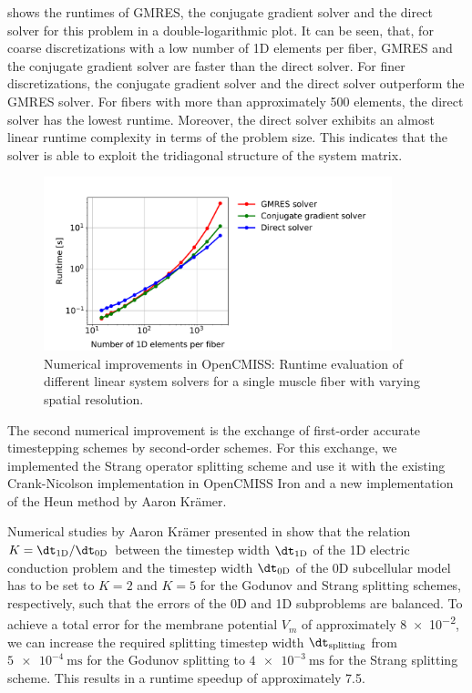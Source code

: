  shows the runtimes of GMRES, the conjugate gradient solver and the direct solver for this problem in a double-logarithmic plot.
It can be seen, that, for coarse discretizations with a low number of 1D elements per fiber, GMRES and the conjugate gradient solver are faster than the direct solver. For finer discretizations, the conjugate gradient solver and the direct solver outperform the GMRES solver. For fibers with more than approximately 500 elements, the direct solver has the lowest runtime. Moreover, the direct solver exhibits an almost linear runtime complexity in terms of the problem size. This indicates that the solver is able to exploit the tridiagonal structure of the system matrix.

\begin{figure}
  \centering%
  \includegraphics[width=0.9\textwidth]{images/results/studies/opencmiss_linear_solvers.pdf}%
  \caption{Numerical improvements in OpenCMISS: Runtime evaluation of different linear system solvers for a single muscle fiber with varying spatial resolution.}%
  \label{fig:opencmiss_linear_solvers}%
\end{figure}%

The second numerical improvement is the exchange of first-order accurate timestepping schemes by second-order schemes. For this exchange, we implemented the Strang operator splitting scheme and use it with the existing Crank-Nicolson implementation in OpenCMISS Iron and a new implementation of the Heun method by Aaron Krämer.

Numerical studies by Aaron Krämer presented in \cite{Bradley:2018:EDB} show that the relation $K=\dt_\text{1D}/\dt_\text{0D}$ between the timestep width $\dt_\text{1D}$ of the 1D electric conduction problem and the timestep width $\dt_\text{0D}$ of the 0D subcellular model has to be set to $K=2$ and $K=5$ for the Godunov and Strang splitting schemes, respectively, such that the errors of the 0D and 1D subproblems are balanced. To achieve a total error for the membrane potential $V_m$ of approximately \num{8e-2}, we can increase the required splitting timestep width $\dt_\text{splitting}$ from $\SI{5e-4}{\ms}$ for the Godunov splitting to $\SI{4e-3}{\ms}$ for the Strang splitting scheme. This results in a runtime speedup  of approximately 7.5.

